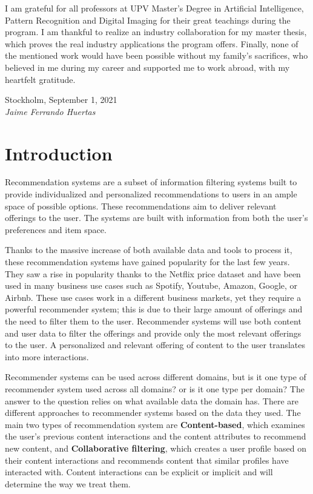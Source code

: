 \documentclass{kththesis}
\begin{document}
I am grateful for all professors at UPV Master's Degree in Artificial Intelligence, Pattern Recognition and Digital Imaging for their great teachings during the program. I am thankful to realize an industry collaboration for my master thesis, which proves the real industry applications the program offers. Finally, none of the mentioned work would have been possible without my family's sacrifices, who believed in me during my career and supported me to work abroad, with my heartfelt gratitude.
\newline
\newline
\newline
\newline
\newline

\noindent Stockholm, September 1, 2021 \\
\noindent \textit{Jaime Ferrando Huertas}

\chapter{Introduction}

Recommendation systems are a subset of information filtering systems built to provide individualized and personalized recommendations to users in an ample space of possible options. These recommendations aim to deliver relevant offerings to the user. The systems are built with information from both the user's preferences and item space.

Thanks to the massive increase of both available data and tools to process it, these recommendation systems have gained popularity for the last few years. They saw a rise in popularity thanks to the Netflix price dataset \cite{netflix} and have been used in many business use cases such as Spotify, Youtube, Amazon, Google, or Airbnb. These use cases work in a different business markets, yet they require a powerful recommender system; this is due to their large amount of offerings and the need to filter them to the user. Recommender systems will use both content and user data to filter the offerings and provide only the most relevant offerings to the user. A personalized and relevant offering of content to the user translates into more interactions.

Recommender systems can be used across different domains, but is it one type of recommender system used across all domains? or is it one type per domain? The answer to the question relies on what available data the domain has. There are different approaches to recommender systems based on the data they used. The main two types of recommendation system are \textbf{Content-based}, which examines the user's previous content interactions and the content attributes to recommend new content, and \textbf{Collaborative filtering}, which creates a user profile based on their content interactions and recommends content that similar profiles have interacted with. Content interactions can be explicit or implicit and will determine the way we treat them.
\end{document}
